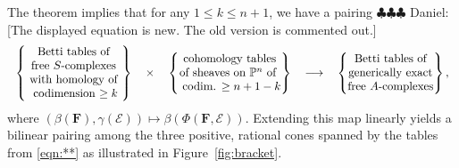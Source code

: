 \documentclass[12pt]{amsart}
\theoremstyle{definition}
\theoremstyle{remark}
\newcommand{\PP}{\mathbb{P}}
\newcommand{\cE}{\mathcal{E}}
\newcommand{\FF}{\mathbf{F}}
\newcommand{\daniel}[1]{{\color{green} \sf $\clubsuit\clubsuit\clubsuit$ Daniel: [#1]}}
\begin{document}
\noindent The theorem implies that for any $1\leq k \leq n+1$, we have a pairing\daniel{The displayed equation is new.  The old version is commented out.}
 \begin{equation}%
\label{eqn:**}
\begin{tabular}{c c c c c}
$\left\{\begin{matrix}
\text{Betti tables of} \\ \text{free $S$-complexes}\\
\text{ with homology of }\\ \text{ codimension $\geq k$}
\end{matrix}\right\}$
&
$\times$
&
$\left\{\begin{matrix}
\text{cohomology tables}\\
\text{of sheaves on } \PP^n \text { of }\\
\text{ codim. $\geq n+1-k$}
\end{matrix}\right\}$
&
$\longrightarrow$
&
$\left\{\begin{matrix}
\text{Betti tables of} \\
\text{generically exact}\\
 \text{free $A$-complexes}\\
\end{matrix}\right\},$
\end{tabular}
\end{equation}
where $(\beta(\FF),\gamma(\cE))\mapsto \beta(\Phi(\FF,\cE))$.  Extending this map linearly yields a bilinear pairing among the three positive, rational cones spanned by the tables from \eqref{eqn:**} as illustrated in Figure~\ref{fig:bracket}. 
\end{document}
